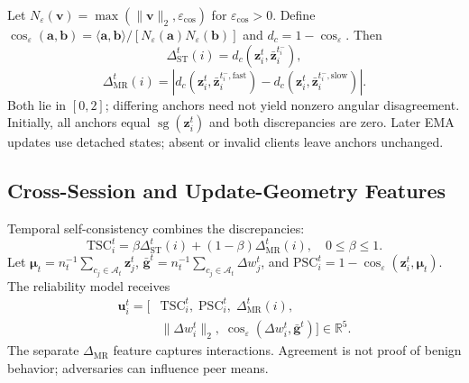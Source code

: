 Let $N_\varepsilon(\mathbf v)=\max(\|\mathbf v\|_2,\varepsilon_{\cos})$ for $\varepsilon_{\cos}>0$. Define $\cos_\varepsilon(\mathbf a,\mathbf b)=\langle\mathbf a,\mathbf b\rangle/[N_\varepsilon(\mathbf a)N_\varepsilon(\mathbf b)]$ and $d_c=1-\cos_\varepsilon$. Then
\begin{equation}
\Delta_{\mathrm{ST}}^t(i)=d_c\!\left(\mathbf z_i^t,\bar{\mathbf z}_i^{t_i^-}\right),
\label{eq:method_st}
\end{equation}
\begin{equation}
\Delta_{\mathrm{MR}}^t(i)=\left|d_c\!\left(\mathbf z_i^t,\bar{\mathbf z}_i^{t_i^-,\mathrm{fast}}\right)-d_c\!\left(\mathbf z_i^t,\bar{\mathbf z}_i^{t_i^-,\mathrm{slow}}\right)\right|.
\label{eq:method_mr}
\end{equation}
Both lie in $[0,2]$; differing anchors need not yield nonzero angular disagreement. Initially, all anchors equal $\operatorname{sg}(\mathbf z_i^t)$ and both discrepancies are zero. Later EMA updates use detached states; absent or invalid clients leave anchors unchanged.

\subsection{Cross-Session and Update-Geometry Features}
\label{subsec:method_features}

Temporal self-consistency combines the discrepancies:
\begin{equation}
\mathrm{TSC}_i^t=\beta\Delta_{\mathrm{ST}}^t(i)+(1-\beta)\Delta_{\mathrm{MR}}^t(i),\quad 0\leq\beta\leq1.
\label{eq:method_tsc}
\end{equation}
Let $\boldsymbol\mu_t=n_t^{-1}\sum_{c_j\in\mathcal A_t}\mathbf z_j^t$, $\bar{\mathbf g}^t=n_t^{-1}\sum_{c_j\in\mathcal A_t}\Delta w_j^t$, and $\mathrm{PSC}_i^t=1-\cos_\varepsilon(\mathbf z_i^t,\boldsymbol\mu_t)$. The reliability model receives
\begin{equation}
\begin{aligned}
\mathbf u_i^t=\big[&\mathrm{TSC}_i^t,\;\mathrm{PSC}_i^t,\;\Delta_{\mathrm{MR}}^t(i),\\
&\|\Delta w_i^t\|_2,\;\cos_\varepsilon\!\left(\Delta w_i^t,\bar{\mathbf g}^t\right)\big]\in\mathbb R^5.
\end{aligned}
\label{eq:method_feature_vector}
\end{equation}
The separate $\Delta_{\mathrm{MR}}$ feature captures interactions. Agreement is not proof of benign behavior; adversaries can influence peer means.

